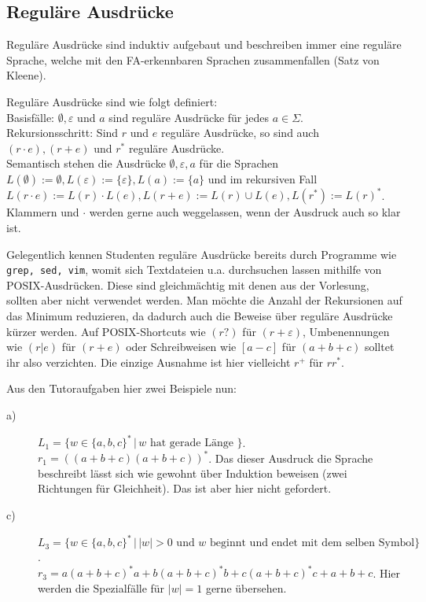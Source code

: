 \documentclass[11pt, a4paper]{article}
\begin{document}
\subsection*{Reguläre Ausdrücke}
Reguläre Ausdrücke sind induktiv aufgebaut und beschreiben immer eine reguläre Sprache, welche mit den FA-erkennbaren Sprachen zusammenfallen (Satz von Kleene).\par
Reguläre Ausdrücke sind wie folgt definiert:\\
Basisfälle: \( \emptyset, \varepsilon \) und \( a \) sind reguläre Ausdrücke für jedes \( a \in \Sigma \).\\
Rekursionsschritt: Sind \( r \) und \( e \) reguläre Ausdrücke, so sind auch \( (r \cdot e), (r + e) \) und \( r^\ast \) reguläre Ausdrücke.\\
Semantisch stehen die Ausdrücke \( \emptyset, \varepsilon, a \) für die Sprachen \( L(\emptyset) := \emptyset, L(\varepsilon) := \{ \varepsilon \}, L(a) := \{ a \} \) und im rekursiven Fall \( L(r \cdot e) := L(r) \cdot L(e), L(r + e) := L(r) \cup L(e), L(r^\ast) := L(r)^\ast \). Klammern und \( \cdot \) werden gerne auch weggelassen, wenn der Ausdruck auch so klar ist.\par
Gelegentlich kennen Studenten reguläre Ausdrücke bereits durch Programme wie \texttt{grep, sed, vim}, womit sich Textdateien u.a. durchsuchen lassen mithilfe von POSIX-Ausdrücken. Diese sind gleichmächtig mit denen aus der Vorlesung, sollten aber nicht verwendet werden. Man möchte die Anzahl der Rekursionen auf das Minimum reduzieren, da dadurch auch die Beweise über reguläre Ausdrücke kürzer werden. Auf POSIX-Shortcuts wie \( (r?) \) für \( (r + \varepsilon) \), Umbenennungen wie \( (r|e) \) für \( (r + e) \) oder Schreibweisen wie \( [a-c] \) für \( (a + b + c) \) solltet ihr also verzichten. Die einzige Ausnahme ist hier vielleicht \( r^+ \) für \( rr^\ast \).\par
Aus den Tutoraufgaben hier zwei Beispiele nun:
\begin{description}
	\item[a)] \( L_1 = \{ w \in \{ a, b, c \}^\ast \,\vert\, w \text{ hat gerade Länge } \} \).\\
		\( r_1 = ((a+b+c)(a+b+c))^\ast \). Das dieser Ausdruck die Sprache beschreibt lässt sich wie gewohnt über Induktion beweisen (zwei Richtungen für Gleichheit). Das ist aber hier nicht gefordert.
	\item[c)] \( L_3 = \{ w \in \{ a, b, c \}^\ast \,\vert\, \left| w \right| > 0 \text{ und } w \text{ beginnt und endet mit dem selben Symbol} \} \).\\
		\( r_3 = a(a+b+c)^\ast a + b(a+b+c)^\ast b + c(a+b+c)^\ast c + a + b + c \). Hier werden die Spezialfälle für \( \left| w \right| = 1 \) gerne übersehen.
\end{description}
\end{document}
